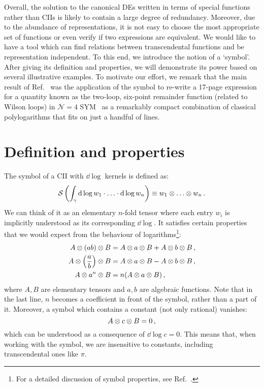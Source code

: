 \documentclass[main.tex]{subfiles}
\begin{document}
Overall, the solution to the canonical DEs written in terms of special functions rather than CIIs is likely to contain a large degree of redundancy. Moreover, due to the abundance of representations, it is not easy to choose the most appropriate set of functions or even verify if two expressions are equivalent. We would like to have a tool which can find relations between transcendental functions and be representation independent. To this end, we introduce the notion of a `symbol'\cite{Goncharov:2010jf, Duhr:2011zq}. After giving its definition and properties, we will demonstrate its power based on several illustrative examples. To motivate our effort, we remark that the main result of Ref.~\cite{Goncharov:2010jf} was the application of the symbol to re-write a 17-page expression for a quantity known as the two-loop, six-point remainder function (related to Wilson loops) in $\mathcal{N}=4$ SYM~\cite{DelDuca:2009au, DelDuca:2010zg} as a remarkably compact combination of classical polylogarithms that fits on just a handful of lines.
\section{Definition and properties}
The symbol of a CII with $\dd \log$ kernels is defined as:
\begin{equation} \label{eq:symboldef}
    \mathcal{S} \left(\int_\gamma \mathrm{d} \log w_1 \cdot \ldots \cdot \mathrm{d} \log w_n \right) \equiv w_1 \otimes \ldots \otimes w_n \,.
\end{equation}
We can think of it as an elementary $n$-fold tensor where each entry $w_i$ is implicitly understood as its corresponding $\dd \log$. It satisfies certain properties that we would expect from the behaviour of logarithms\footnote{For a detailed discussion of symbol properties, see Ref.~\cite{Duhr:2011zq}.}:
\begin{subequations} \label{eq:symbolproperties}
\begin{align}
    A \otimes (ab) \otimes B &= A \otimes a \otimes B + A \otimes b \otimes B\,, \\
    A \otimes \left(\frac{a}{b}\right) \otimes B &= A \otimes a \otimes B - A \otimes b \otimes B\,, \\
    A \otimes a^n \otimes B &= n(A \otimes a \otimes B)\,,
\end{align}
\end{subequations}
where $A, B$ are elementary tensors and $a, b$ are algebraic functions. Note that in the last line, $n$ becomes a coefficient in front of the symbol, rather than a part of it. Moreover, a symbol which contains a constant (not only rational) vanishes:
\begin{equation} \label{eq:symbolAcB}
    A \otimes c \otimes B = 0\,,
\end{equation}
which can be understood as a consequence of $\dd \log c = 0$. This means that, when working with the symbol, we are insensitive to constants, including transcendental ones like $\pi$. 
\end{document}

